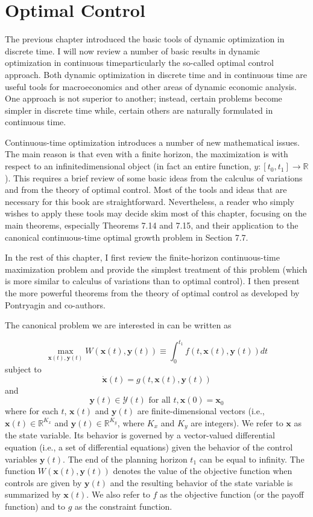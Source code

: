 \documentclass[\topdir/lecture_notes.tex]{subfiles}
\begin{document}
\captionsetup{singlelinecheck=false}
\section{Optimal Control}
The previous chapter introduced the basic tools of dynamic optimization in discrete time. I will now review a number of basic results in dynamic optimization in continuous timeparticularly the so-called optimal control approach. Both dynamic optimization in discrete time and in continuous time are useful tools for macroeconomics and other areas of dynamic economic analysis. One approach is not superior to another; instead, certain problems become simpler in discrete time while, certain others are naturally formulated in continuous time.

Continuous-time optimization introduces a number of new mathematical issues. The main reason is that even with a finite horizon, the maximization is with respect to an infinitedimensional object (in fact an entire function, $y:\left[t_0, t_1\right] \rightarrow \mathbb{R}$ ). This requires a brief review of some basic ideas from the calculus of variations and from the theory of optimal control. Most of the tools and ideas that are necessary for this book are straightforward. Nevertheless, a reader who simply wishes to apply these tools may decide skim most of this chapter, focusing on the main theorems, especially Theorems 7.14 and 7.15, and their application to the canonical continuous-time optimal growth problem in Section 7.7.

In the rest of this chapter, I first review the finite-horizon continuous-time maximization problem and provide the simplest treatment of this problem (which is more similar to calculus of variations than to optimal control). I then present the more powerful theorems from the theory of optimal control as developed by Pontryagin and co-authors.

The canonical problem we are interested in can be written as

\[
\max _{\mathbf{x}(t), \mathbf{y}(t)} W(\mathbf{x}(t), \mathbf{y}(t)) \equiv \int_{0}^{t_{1}} f(t, \mathbf{x}(t), \mathbf{y}(t)) d t
\]
subject to
\[
\dot{\mathbf{x}}(t)=g(t, \mathbf{x}(t), \mathbf{y}(t))
\]
and
\[
\mathbf{y}(t) \in \mathcal{Y}(t) \text { for all } t, \mathbf{x}(0)=\mathbf{x}_{0}
\]
where for each $t$, $\mathbf{x}(t)$ and $\mathbf{y}(t)$ are finite-dimensional vectors (i.e., $\mathbf{x}(t) \in \mathbb{R}^{K_x}$ and $\mathbf{y}(t) \in \mathbb{R}^{K_y}$, where $K_x$ and $K_y$ are integers). We refer to $\mathbf{x}$ as the state variable. Its behavior is governed by a vector-valued differential equation (i.e., a set of differential equations) given the behavior of the control variables $\mathbf{y}(t)$. The end of the planning horizon $t_1$ can be equal to infinity. The function $W(\mathbf{x}(t), \mathbf{y}(t))$ denotes the value of the objective function when\\
controls are given by $\mathbf{y}(t)$ and the resulting behavior of the state variable is summarized by $\mathbf{x}(t)$. We also refer to $f$ as the objective function (or the payoff function) and to $g$ as the constraint function.
\end{document}
